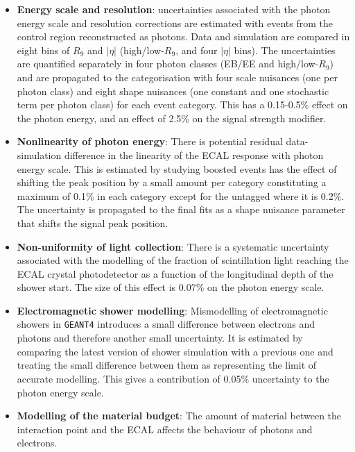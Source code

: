 \begin{itemize}[noitemsep]
    \item {\textbf{Energy scale and resolution}: 
           uncertainties associated with the photon energy scale and resolution corrections
           are estimated with events from the \Zee control region reconstructed as photons. Data and simulation are compared in eight bins of $R_9$ and $|\eta|$ (high/low-$R_9$, and four $|\eta|$ bins). 
           The uncertainties are quantified separately in four photon classes (EB/EE and high/low-$R_9$) and are propagated to the categorisation with four scale nuisances (one per photon class) and eight shape nuisances (one constant and one stochastic term per photon class) for each event category. 
           This has a 0.15-0.5\% effect on the photon energy, and an effect of 2.5\% on the signal strength modifier. 
           }
    \item {\textbf{Nonlinearity of photon energy}: 
          There is potential residual data-simulation difference in the linearity of the ECAL response with photon energy scale. 
          This is estimated by studying boosted \Zee events has the effect of shifting the peak position by a small amount per category constituting a maximum of 0.1\% in each category except for the untagged where it is 0.2\%. The uncertainty is propagated to the final fits as a shape nuisance parameter that shifts the signal peak position.
          }
    \item {\textbf{Non-uniformity of light collection}: 
           There is a systematic uncertainty associated with the modelling of the fraction of scintillation light reaching the ECAL crystal photodetector as a function of the longitudinal depth of the shower start. The size of this effect is 0.07\% on the photon energy scale.
           }
    \item {\textbf{Electromagnetic shower modelling}: 
        Mismodelling of electromagnetic showers in \texttt{GEANT4} introduces a small difference between electrons and photons and therefore another small uncertainty. 
           It is estimated by comparing the latest version of shower simulation with a previous one and treating the small difference between them as representing the limit of accurate modelling. 
           This gives a contribution of 0.05\% uncertainty to the photon energy scale.
           }
    \item {\textbf{Modelling of the material budget}: 
           The amount of material between the interaction point and the ECAL affects the behaviour of photons and electrons. 
}
\end{itemize}
